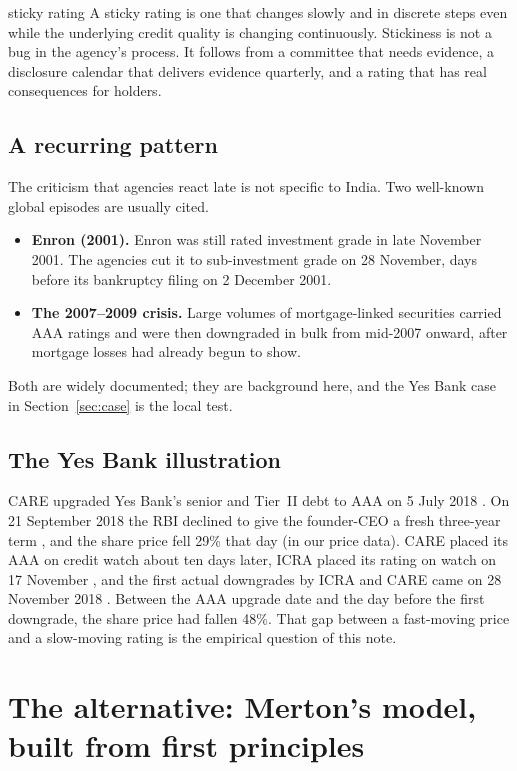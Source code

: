 \begin{defbox}{sticky rating}
A sticky rating is one that changes slowly and in discrete steps even while the underlying credit quality is changing continuously. Stickiness is not a bug in the agency's process. It follows from a committee that needs evidence, a disclosure calendar that delivers evidence quarterly, and a rating that has real consequences for holders.
\end{defbox}

\subsection{A recurring pattern}
The criticism that agencies react late is not specific to India. Two well-known global episodes are usually cited.
\begin{itemize}
\item \textbf{Enron (2001).} Enron was still rated investment grade in late November 2001. The agencies cut it to sub-investment grade on 28 November, days before its bankruptcy filing on 2 December 2001.
\item \textbf{The 2007--2009 crisis.} Large volumes of mortgage-linked securities carried AAA ratings and were then downgraded in bulk from mid-2007 onward, after mortgage losses had already begun to show.
\end{itemize}
Both are widely documented; they are background here, and the Yes Bank case in Section~\ref{sec:case} is the local test.

\subsection{The Yes Bank illustration}
CARE upgraded Yes Bank's senior and Tier~II debt to AAA on 5 July 2018 \cite{bsCareWatch}. On 21 September 2018 the RBI declined to give the founder-CEO a fresh three-year term \cite{bsIcraWatch}, and the share price fell 29\% that day (in our price data). CARE placed its AAA on credit watch about ten days later, ICRA placed its rating on watch on 17 November \cite{bsIcraWatch}, and the first actual downgrades by ICRA and CARE came on 28 November 2018 \cite{bsNov28}. Between the AAA upgrade date and the day before the first downgrade, the share price had fallen 48\%. That gap between a fast-moving price and a slow-moving rating is the empirical question of this note.

\section{The alternative: Merton's model, built from first principles}
\label{sec:merton}

